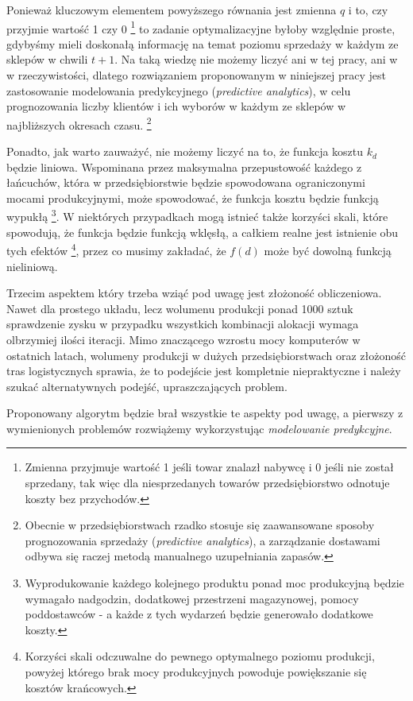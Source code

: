 \documentclass[polish, twoside, 12pt, a4paper]{article}
\theoremstyle{definition}
\theoremstyle{plain}
\theoremstyle{remark}
\begin{document}
Ponieważ kluczowym elementem powyższego równania jest zmienna $q$ i to, czy przyjmie wartość 1 czy 0 \footnote{Zmienna przyjmuje wartość 1 jeśli towar znalazł nabywcę i 0 jeśli nie został sprzedany, tak więc dla niesprzedanych towarów przedsiębiorstwo odnotuje koszty bez przychodów.} to zadanie optymalizacyjne byłoby względnie proste, gdybyśmy mieli doskonałą informację na temat poziomu sprzedaży w każdym ze sklepów w chwili $ t + 1 $. Na taką wiedzę nie możemy liczyć ani w tej pracy, ani w w rzeczywistości, dlatego rozwiązaniem proponowanym w niniejszej pracy jest zastosowanie modelowania predykcyjnego (\textit{predictive analytics}), w celu prognozowania liczby klientów i ich wyborów w każdym ze sklepów w najbliższych okresach czasu. \footnote{Obecnie w przedsiębiorstwach rzadko stosuje się zaawansowane sposoby prognozowania sprzedaży (\textit{predictive analytics}), a zarządzanie dostawami odbywa się raczej metodą manualnego uzupełniania zapasów.} 

Ponadto, jak warto zauważyć, nie możemy liczyć na to, że funkcja kosztu $k_d$ będzie liniowa. Wspominana przez \cite{Kawa2010} maksymalna przepustowość każdego z łańcuchów, która w przedsiębiorstwie będzie spowodowana ograniczonymi mocami produkcyjnymi, może spowodować, że funkcja kosztu będzie funkcją wypukłą \footnote{Wyprodukowanie każdego kolejnego produktu ponad moc produkcyjną będzie wymagało nadgodzin, dodatkowej przestrzeni magazynowej, pomocy poddostawców - a każde z tych wydarzeń będzie generowało dodatkowe koszty.}. W niektórych przypadkach mogą istnieć także korzyści skali, które spowodują, że funkcja będzie funkcją wklęsłą, a całkiem realne jest istnienie obu tych efektów  \footnote{Korzyści skali odczuwalne do pewnego optymalnego poziomu produkcji, powyżej którego brak mocy produkcyjnych powoduje  powiększanie się kosztów krańcowych.}, przez co musimy zakładać, że $f(d)$ może być dowolną funkcją nieliniową.

Trzecim aspektem który trzeba wziąć pod uwagę jest złożoność obliczeniowa. Nawet dla prostego układu, lecz wolumenu produkcji ponad 1000 sztuk sprawdzenie zysku w przypadku wszystkich kombinacji alokacji wymaga olbrzymiej ilości iteracji. Mimo znaczącego wzrostu mocy komputerów w ostatnich latach, wolumeny produkcji w dużych przedsiębiorstwach oraz złożoność tras logistycznych sprawia, że to podejście jest kompletnie niepraktyczne i należy szukać alternatywnych podejść, upraszczających problem.

 Proponowany algorytm będzie brał wszystkie te aspekty pod uwagę, a pierwszy z wymienionych problemów rozwiążemy wykorzystując  \textit{modelowanie predykcyjne}.
\end{document}
